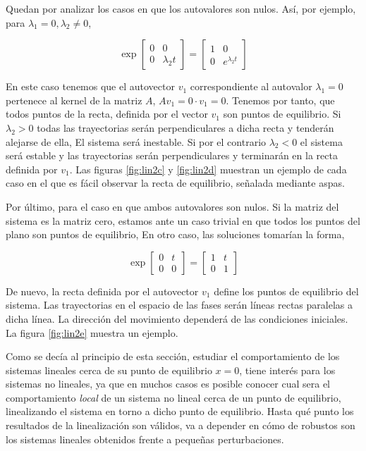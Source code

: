Quedan por analizar los casos en que los autovalores son nulos. Así, por ejemplo, para $\lambda_1 = 0, \lambda_2 \ne 0$,  

\begin{equation}
\exp\begin{bmatrix}
0 & 0\\ 0 & \lambda_2 t
\end{bmatrix} = 
\begin{bmatrix}
1 & 0\\
0 & e^{\lambda_2 t}
\end{bmatrix}
\end{equation}

En este caso tenemos que el autovector $v_1$ correspondiente al autovalor $\lambda_1=0$ pertenece al kernel de la matriz $A$, $Av_1 = 0\cdot v_1 = 0$. Tenemos por tanto, que todos puntos de la recta, definida por el vector $v_1$ son puntos de equilibrio. Si $\lambda_2 >0$ todas las trayectorias serán perpendiculares a dicha recta y tenderán alejarse de ella, El sistema será inestable. Si por el contrario $\lambda_2 < 0 $ el sistema será estable y las trayectorias serán perpendiculares y terminarán en la recta definida por $v_1$. Las figuras \ref{fig:lin2c} y \ref{fig:lin2d} muestran un ejemplo de cada caso en el que es fácil observar la recta de equilibrio, señalada mediante aspas.

Por último, para el caso en que ambos autovalores son nulos. Si la matriz del sistema es la matriz cero, estamos ante un caso trivial en que todos los puntos del plano son puntos de equilibrio, En otro caso, las soluciones tomarían la forma,

\begin{equation}
\exp\begin{bmatrix}
0 & t\\ 0 & 0
\end{bmatrix} = 
\begin{bmatrix}
1 & t\\
0 & 1
\end{bmatrix}
\end{equation}

De nuevo, la recta definida por el autovector $v_1$ define los puntos de equilibrio del sistema. Las trayectorias en el espacio de las fases serán líneas rectas paralelas a dicha línea. La dirección del movimiento dependerá de las condiciones iniciales. La figura \ref{fig:lin2e} muestra un ejemplo.

Como se decía al principio de esta sección, estudiar el comportamiento de los sistemas lineales cerca de su punto de equilibrio $x=0$, tiene interés para los sistemas no lineales, ya que en muchos casos es posible conocer cual sera el comportamiento \emph{local} de un sistema no lineal cerca de un punto de equilibrio, linealizando el sistema en torno a dicho punto de equilibrio. Hasta qué punto los resultados de la linealización son válidos, va a depender en cómo de robustos son los sistemas lineales obtenidos frente a pequeñas perturbaciones. 

